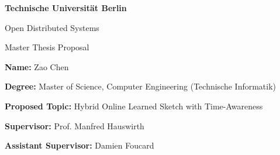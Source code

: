 
\bigskip
\bigskip

\begin{figure}[H]
  \centering
  \vspace*{-1.22cm}
  \hfill
\end{figure}

\centerline{\textbf{\LARGE{Technische Universität Berlin}}}
\smallskip

\centerline{{\large{Open Distributed Systems}}}
\smallskip
\centerline{{\large{Master Thesis Proposal}}}
\bigskip
\bigskip


\noindent \textbf{Name:}
Zao Chen

\bigskip

\noindent \textbf{Degree:}
Master of Science, Computer Engineering (Technische Informatik)

\bigskip 

\noindent \textbf{Proposed Topic:}
Hybrid Online Learned Sketch with Time-Awareness
\bigskip

\noindent \textbf{Supervisor:}
Prof. Manfred Hauswirth

\noindent \textbf{Assistant Supervisor:}
Damien Foucard
 
\bigskip

